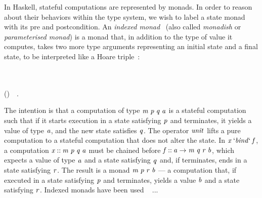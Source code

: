 In Haskell, stateful computations are represented by monads. In order to
reason about their behaviors within the type system, we wish to label a state
monad with its pre and postcondition. An \emph{indexed
monad}~\cite{indexedmonad} (also called \emph{monadish} or
\emph{parameterised monad}) is a monad that, in addition to the type of value
it computes, takes two more type arguments representing an initial state and
a final state, to be interpreted like a Hoare triple~\cite{kleisli}:
\begin{hscode}\SaveRestoreHook
{}%
%
%
\>[B]{}\;\;\;\<[E]%
\\
\>[B]{}\<[5]%
\>[5]{}\mathbin{::}\to {}\;\;\;\<[E]%
\\
\>[B]{}\<[5]%
\>[5]{}\mathbin{::}\;\;\;\to (\to {}\;\;\;)\to {}\;\;\;~~.{}\<[E]%
\ColumnHook
\end{hscode}\resethooks
The intention is that a computation of type \ensuremath{\Varid{m}\;\Varid{p}\;\Varid{q}\;\Varid{a}} is a stateful computation
such that if it starts execution in a state satisfying \ensuremath{\Varid{p}} and terminates, it
yields a value of type \ensuremath{\Varid{a}}, and the new state satisfies \ensuremath{\Varid{q}}.
The operator \ensuremath{\Varid{unit}} lifts a pure computation to a stateful computation that
does not alter the state. In \ensuremath{\Varid{x}\mathbin{`\Varid{bind}`}\Varid{f}}, a computation \ensuremath{\Varid{x}\mathbin{::}\Varid{m}\;\Varid{p}\;\Varid{q}\;\Varid{a}} must
be chained before \ensuremath{\Varid{f}\mathbin{::}\Varid{a}\to \Varid{m}\;\Varid{q}\;\Varid{r}\;\Varid{b}}, which expects a value of type \ensuremath{\Varid{a}} and
a state satisfying \ensuremath{\Varid{q}} and, if terminates, ends in a state satisfying \ensuremath{\Varid{r}}.
The result is a monad \ensuremath{\Varid{m}\;\Varid{p}\;\Varid{r}\;\Varid{b}} --- a computation that, if executed in a state
satisfying \ensuremath{\Varid{p}} and terminates, yields a value \ensuremath{\Varid{b}} and a state satisfying \ensuremath{\Varid{r}}.
Indexed monads have been used ~\cite{typefun,staticresources} ... 


